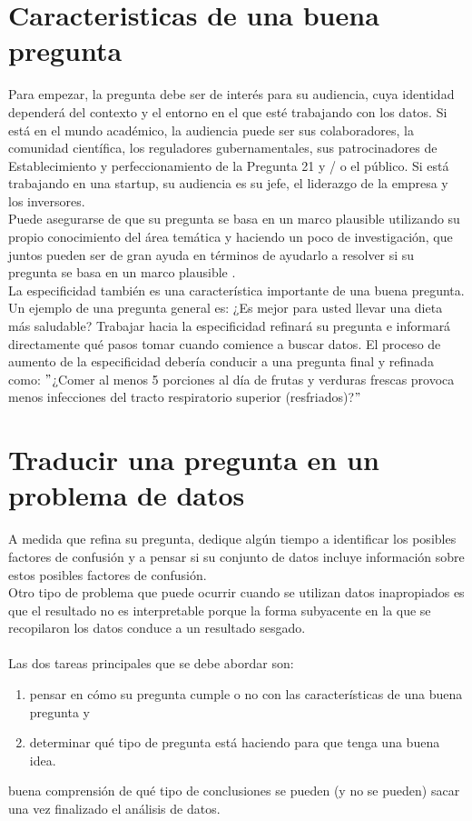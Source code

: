 \documentclass[10pt]{book}
\begin{document}
\section{Caracteristicas de una buena pregunta}
Para empezar, la pregunta debe ser de interés para su audiencia, cuya identidad dependerá del contexto y el entorno en el que esté trabajando con los datos. Si está en el mundo académico, la audiencia puede ser sus colaboradores, la comunidad científica, los reguladores gubernamentales, sus patrocinadores de Establecimiento y perfeccionamiento de la Pregunta 21 y / o el público. Si está trabajando en una startup, su audiencia es su jefe, el liderazgo de la empresa y los inversores.\\
Puede asegurarse de que su pregunta se basa en un marco plausible utilizando su propio conocimiento del área temática y haciendo un poco de investigación, que juntos pueden ser de gran ayuda en términos de ayudarlo a resolver si su pregunta se basa en un marco plausible .\\
La especificidad también es una característica importante de una buena pregunta. Un ejemplo de una pregunta general es: ¿Es mejor para usted llevar una dieta más saludable? Trabajar hacia la especificidad refinará su pregunta e informará directamente qué pasos tomar cuando comience a buscar datos. El proceso de aumento de la especificidad debería conducir a una pregunta final y refinada como: $"$¿Comer al menos 5 porciones al día de frutas y verduras frescas provoca menos infecciones del tracto respiratorio superior (resfriados)?$"$\\

\section{Traducir una pregunta en un problema de datos}
A medida que refina su pregunta, dedique algún tiempo a identificar los posibles factores de confusión y a pensar si su conjunto de datos incluye información sobre estos posibles factores de confusión.\\
Otro tipo de problema que puede ocurrir cuando se utilizan datos inapropiados es que el resultado no es interpretable porque la forma subyacente en la que se recopilaron los datos conduce a un resultado sesgado.\\\\
Las dos tareas principales que se debe abordar son: 
\begin{enumerate}[\bfseries 1.]
\item pensar en cómo su pregunta cumple o no con las características de una buena pregunta y 
\item determinar qué tipo de pregunta está haciendo para que tenga una buena idea. 
\end{enumerate}
buena comprensión de qué tipo de conclusiones se pueden (y no se pueden) sacar una vez finalizado el análisis de datos.\\
\end{document}
